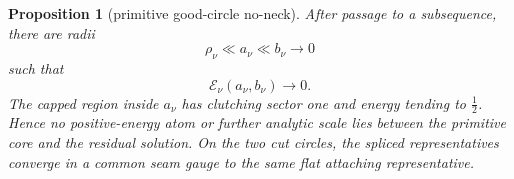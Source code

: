 \documentclass[11pt]{amsart}
\newtheorem{proposition}[theorem]{Proposition}
\theoremstyle{definition}
\theoremstyle{remark}
\theoremstyle{plain}
\newcommand{\cE}{\mathcal{E}}
\begin{document}
\begin{proposition}[primitive good-circle no-neck]
\label{prop:primitive-no-neck}
After passage to a subsequence, there are radii
\[
                 \rho_\nu\ll a_\nu\ll b_\nu\longrightarrow0
\]
such that
\begin{equation}\label{eq:no-neck}
                         \cE_\nu(a_\nu,b_\nu)\longrightarrow0.
\end{equation}
The capped region inside $a_\nu$ has clutching sector one and energy
tending to $\frac12$.  Hence no positive-energy atom or further analytic
scale lies between the primitive core and the residual solution.  On the
two cut circles, the spliced representatives converge in a common seam
gauge to the same flat attaching representative.
\end{proposition}
\end{document}
